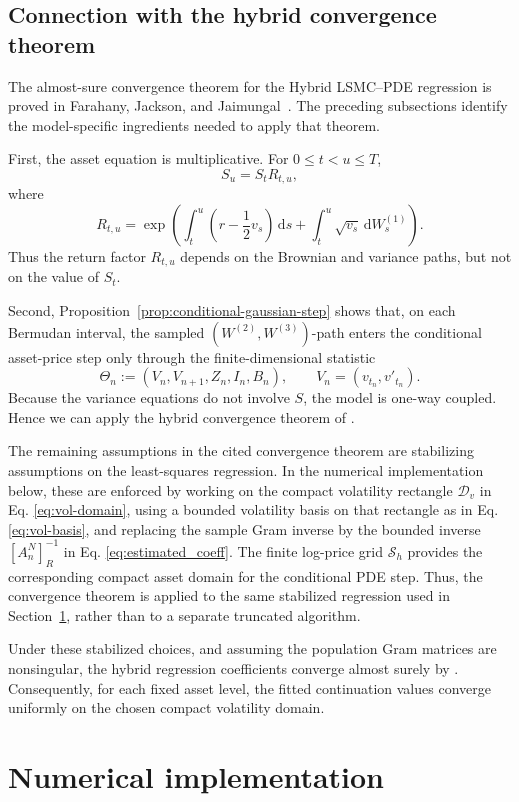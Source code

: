 \documentclass[pdflatex,sn-mathphys-num]{sn-jnl}
\theoremstyle{thmstyleone}%
\theoremstyle{thmstylethree}%
\theoremstyle{thmstyletwo}%
\newcommand{\dd}{\mathrm d}
\begin{document}
\subsection{Connection with the hybrid convergence theorem}\label{sec:as_convergence}

The almost-sure convergence theorem for the Hybrid LSMC--PDE regression is proved in Farahany, Jackson, and Jaimungal~\cite{farahany2020mixing}. The preceding subsections identify the model-specific ingredients needed to apply that theorem.

First, the asset equation is multiplicative. For $0\le t<u\le T$,
$$
S_u=S_tR_{t,u},
$$
where
$$
R_{t,u}
=
\exp\left(
\int_t^u\left(r-\frac12v_s\right)\,\dd s
+
\int_t^u\sqrt{v_s}\,\dd W_s^{(1)}
\right).
$$
Thus the return factor $R_{t,u}$ depends on the Brownian and variance paths,
but not on the value of $S_t$.

Second, Proposition~\ref{prop:conditional-gaussian-step} shows that, on each
Bermudan interval, the sampled $(W^{(2)},W^{(3)})$-path enters the conditional
asset-price step only through the finite-dimensional statistic
$$
\Theta_n
:=
(V_n,V_{n+1},Z_n,I_n,B_n),
\qquad
V_n=(v_{t_n},v'_{t_n}).
$$
Because the variance equations do not involve $S$, the model is one-way
coupled. Hence we can apply the hybrid convergence theorem of
\cite[Theorem~1]{farahany2020mixing}.

The remaining assumptions in the cited convergence theorem are stabilizing assumptions on the least-squares regression. In the numerical implementation below, these are enforced by working on the compact volatility rectangle $\mathcal D_v$ in Eq. \eqref{eq:vol-domain}, using a bounded volatility basis on that rectangle as in Eq. \eqref{eq:vol-basis}, and replacing the sample Gram inverse by the bounded inverse $[A_n^N]^{-1}_R$ in Eq. \eqref{eq:estimated_coeff}. The finite log-price grid $\mathcal S_h$ provides the corresponding compact asset domain
for the conditional PDE step. Thus, the convergence theorem is applied to the same stabilized regression used in Section~\ref{sec:hybrid-method}, rather than to a separate truncated algorithm.

Under these stabilized choices, and assuming the population Gram matrices are
nonsingular, the hybrid regression coefficients converge almost surely by
\cite[Theorem~1]{farahany2020mixing}. Consequently, for each fixed asset level,
the fitted continuation values converge uniformly on the chosen compact
volatility domain.
\section{Numerical implementation}
\label{sec:hybrid-method}
\end{document}
